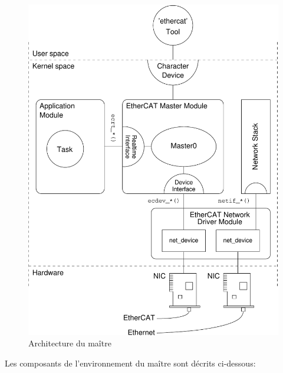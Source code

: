 \documentclass[a4paper,12pt,BCOR6mm,bibtotoc,idxtotoc]{scrbook}
\begin{document}
\begin{figure}[htbp]
  \centering
  \includegraphics[width=\textwidth]{images/architecture}
  \caption{Architecture du ma\^itre}
  \label{fig:arch}
\end{figure}

Les composants de l'environnement du ma\^itre sont d\'ecrits
ci-dessous:
\end{document}
